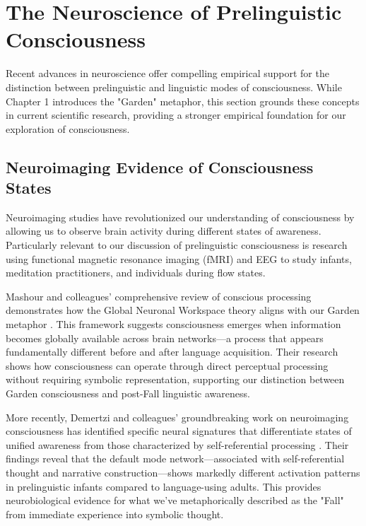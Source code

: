 \section{The Neuroscience of Prelinguistic Consciousness}

Recent advances in neuroscience offer compelling empirical support for the distinction between prelinguistic and linguistic modes of consciousness. While Chapter 1 introduces the "Garden" metaphor, this section grounds these concepts in current scientific research, providing a stronger empirical foundation for our exploration of consciousness.

\subsection{Neuroimaging Evidence of Consciousness States}

Neuroimaging studies have revolutionized our understanding of consciousness by allowing us to observe brain activity during different states of awareness. Particularly relevant to our discussion of prelinguistic consciousness is research using functional magnetic resonance imaging (fMRI) and EEG to study infants, meditation practitioners, and individuals during flow states.

Mashour and colleagues' comprehensive review of conscious processing demonstrates how the Global Neuronal Workspace theory aligns with our Garden metaphor \parencite{mashour2020noninvasive}. This framework suggests consciousness emerges when information becomes globally available across brain networks—a process that appears fundamentally different before and after language acquisition. Their research shows how consciousness can operate through direct perceptual processing without requiring symbolic representation, supporting our distinction between Garden consciousness and post-Fall linguistic awareness.

More recently, Demertzi and colleagues' groundbreaking work on neuroimaging consciousness has identified specific neural signatures that differentiate states of unified awareness from those characterized by self-referential processing \parencite{demertzi2024neuroimaging}. Their findings reveal that the default mode network—associated with self-referential thought and narrative construction—shows markedly different activation patterns in prelinguistic infants compared to language-using adults. This provides neurobiological evidence for what we've metaphorically described as the "Fall" from immediate experience into symbolic thought.

